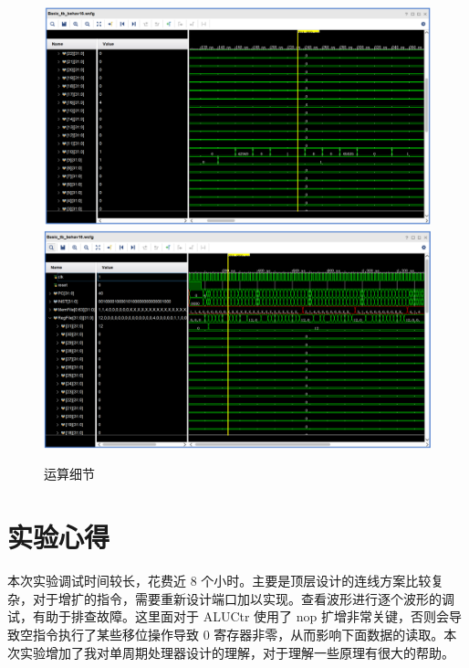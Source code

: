 \documentclass[a4paper,UTF8]{ctexart}
\begin{document}
\begin{figure}[h]
    \centering
    \includegraphics[width=\textwidth]{calcdetail.png}
    \includegraphics[width=\textwidth]{memdetail.png}
    \caption{运算细节}
    \label{fig:calcde}
\end{figure}

\section{实验心得}

本次实验调试时间较长，花费近 8 个小时。主要是顶层设计的连线方案比较复杂，对于增扩的指令，需要重新设计端口加以实现。查看波形进行逐个波形的调试，有助于排查故障。这里面对于 ALUCtr 使用了 nop 扩增非常关键，否则会导致空指令执行了某些移位操作导致 0 寄存器非零，从而影响下面数据的读取。本次实验增加了我对单周期处理器设计的理解，对于理解一些原理有很大的帮助。
\end{document}
